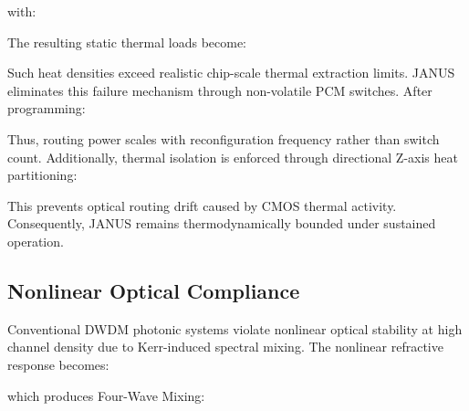 \documentclass[journal]{IEEEtran}
\begin{document}
with:

\begin{center}
\end{center}

The resulting static thermal loads become:
\begin{center}
\end{center}

\begin{center}
\end{center}

\begin{center}
\end{center}

Such heat densities exceed realistic chip-scale thermal extraction limits. JANUS eliminates this failure mechanism through non-volatile PCM switches. After programming:

\begin{center}
\end{center}

Thus, routing power scales with reconfiguration frequency rather than switch count. Additionally, thermal isolation is enforced through directional Z-axis heat partitioning:

\begin{center}
\end{center}

This prevents optical routing drift caused by CMOS thermal activity. Consequently, JANUS remains thermodynamically bounded under sustained operation.

\subsection{\textbf{Nonlinear Optical Compliance}}

Conventional DWDM photonic systems violate nonlinear optical stability at high channel density due to Kerr-induced spectral mixing. The nonlinear refractive response becomes:

\begin{center}
\end{center}

which produces Four-Wave Mixing:

\begin{center}
\end{center}
\end{document}
